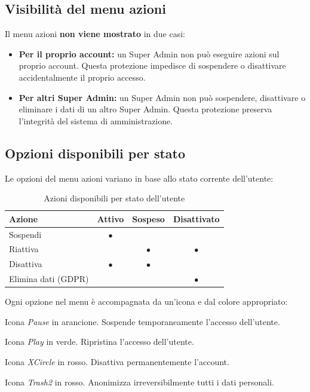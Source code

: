 \documentclass[a4paper,11pt,oneside]{book}
\begin{document}
\subsection{Visibilit\`a del menu azioni}

Il menu azioni \textbf{non viene mostrato} in due casi:

\begin{itemize}[leftmargin=1.5em]
  \item \textbf{Per il proprio account:} un Super Admin non pu\`o eseguire azioni sul proprio account. Questa protezione impedisce di sospendere o disattivare accidentalmente il proprio accesso.
  \item \textbf{Per altri Super Admin:} un Super Admin non pu\`o sospendere, disattivare o eliminare i dati di un altro Super Admin. Questa protezione preserva l'integrit\`a del sistema di amministrazione.
\end{itemize}

\subsection{Opzioni disponibili per stato}

Le opzioni del menu azioni variano in base allo stato corrente dell'utente:

\begin{table}[htbp]
\centering
\caption{Azioni disponibili per stato dell'utente}
\label{tab:azioni-per-stato-utente}
\begin{tabularx}{\textwidth}{X c c c}
\toprule
\textbf{Azione} & \textbf{Attivo} & \textbf{Sospeso} & \textbf{Disattivato} \\
\midrule
Sospendi              & $\bullet$ &           &              \\
Riattiva              &           & $\bullet$ & $\bullet$    \\
Disattiva             & $\bullet$ & $\bullet$ &              \\
Elimina dati (GDPR)   &           &           & $\bullet$    \\
\bottomrule
\end{tabularx}
\end{table}

Ogni opzione nel menu \`e accompagnata da un'icona e dal colore appropriato:

\begin{description}[leftmargin=1.5em, style=nextline]
  \item[Sospendi] Icona \textit{Pause} in \textcolor{namoOrange}{arancione}. Sospende temporaneamente l'accesso dell'utente.
  \item[Riattiva] Icona \textit{Play} in \textcolor{namoGreen}{verde}. Ripristina l'accesso dell'utente.
  \item[Disattiva] Icona \textit{XCircle} in \textcolor{namoRed}{rosso}. Disattiva permanentemente l'account.
  \item[Elimina dati (GDPR)] Icona \textit{Trash2} in \textcolor{namoRed}{rosso}. Anonimizza irreversibilmente tutti i dati personali.
\end{description}
\end{document}
